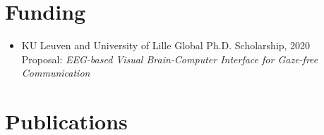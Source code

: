 \documentclass[10pt,a4paper]{article}
\begin{document}
    \section*{Funding}

    \begin{itemize}
        \item KU Leuven and University of Lille Global Ph.D. Scholarship, 2020 \\
        Proposal: \textit{EEG-based Visual Brain-Computer Interface for Gaze-free Communication}
    \end{itemize}

    \section*{Publications}


    \nocite{*}

    \printbibliography[heading=none]
\end{document}
